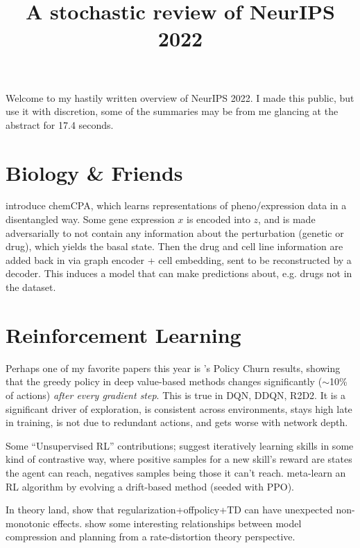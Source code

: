 


\title{A stochastic review of NeurIPS 2022}

Welcome to my hastily written overview of NeurIPS 2022. I made this public, but use it with discretion, some of the summaries may be from me glancing at the abstract for 17.4 seconds.

\donumbersections
\tableofcontents

\section{Biology & Friends}

\citet{hetzel2022predicting} introduce chemCPA, which learns representations of pheno/expression data in a disentangled way. Some gene expression $x$ is encoded into $z$, and is made adversarially to not contain any information about the perturbation (genetic or drug), which yields the basal state. Then the drug and cell line information are added back in via graph encoder + cell embedding, sent to be reconstructed by a decoder. This induces a model that can make predictions about, e.g. drugs not in the dataset.
\section{Reinforcement Learning}

Perhaps one of my favorite papers this year is \citet{schaul2022the}'s Policy Churn results, showing that the greedy policy in deep value-based methods changes significantly ($\sim$10\% of actions) \emph{after every gradient step}. This is true in DQN, DDQN, R2D2. It is a significant driver of exploration, is consistent across environments, stays high late in training, is not due to redundant actions, and gets worse with network depth.



Some ``Unsupervised RL'' contributions; \citet{meier2022openended} suggest iteratively learning skills in some kind of contrastive way, where positive samples for a new skill's reward are states the agent can reach, negatives samples being those it can't reach. \citet{lu2022discovered} meta-learn an RL algorithm by evolving a drift-based method (seeded with PPO).

In theory land, \citet{manek2022the} show that regularization+offpolicy+TD can have unexpected non-monotonic effects. \citet{arumugam2022deciding} show some interesting relationships between model compression and planning from a rate-distortion theory perspective.


